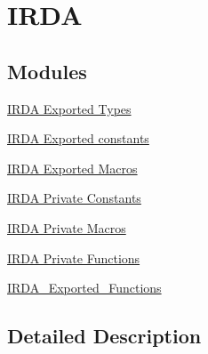 \hypertarget{group___i_r_d_a}{}\section{I\+R\+DA}
\label{group___i_r_d_a}
\subsection*{Modules}
\begin{DoxyCompactItemize}
\item 
\hyperlink{group___i_r_d_a___exported___types}{I\+R\+D\+A Exported Types}
\item 
\hyperlink{group___i_r_d_a___exported___constants}{I\+R\+D\+A Exported constants}
\item 
\hyperlink{group___i_r_d_a___exported___macros}{I\+R\+D\+A Exported Macros}
\item 
\hyperlink{group___i_r_d_a___private___constants}{I\+R\+D\+A Private Constants}
\item 
\hyperlink{group___i_r_d_a___private___macros}{I\+R\+D\+A Private Macros}
\item 
\hyperlink{group___i_r_d_a___private___functions}{I\+R\+D\+A Private Functions}
\item 
\hyperlink{group___i_r_d_a___exported___functions}{I\+R\+D\+A\+\_\+\+Exported\+\_\+\+Functions}
\end{DoxyCompactItemize}


\subsection{Detailed Description}

